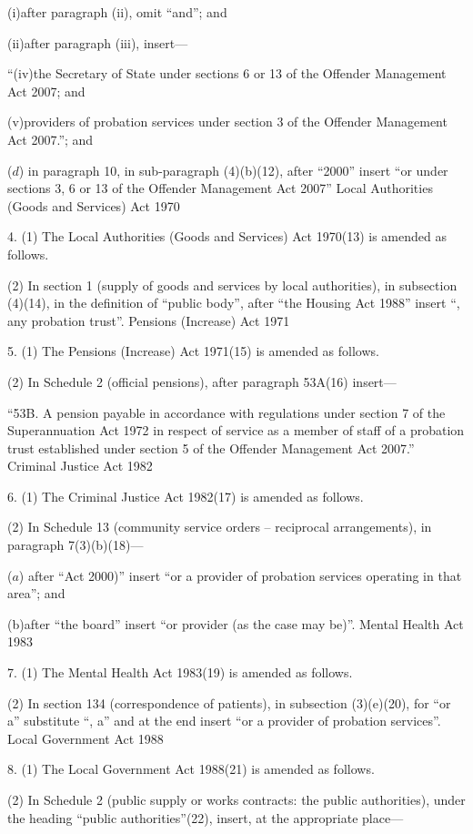 \documentclass[12pt,a4paper]{article}
\begin{document}
(i)after paragraph (ii), omit “and”; and

(ii)after paragraph (iii), insert—

“(iv)the Secretary of State under sections 6 or 13 of the Offender Management Act 2007; and

(v)providers of probation services under section 3 of the Offender Management Act 2007.”; and

($d$) in paragraph 10, in sub-paragraph (4)(b)(12), after “2000” insert “or under sections 3, 6 or 13 of the Offender Management Act 2007”
Local Authorities (Goods and Services) Act 1970

4.  (1)  The Local Authorities (Goods and Services) Act 1970(13) is amended as follows.

(2) In section 1 (supply of goods and services by local authorities), in subsection (4)(14), in the definition of “public body”, after “the Housing Act 1988” insert “, any probation trust”.
Pensions (Increase) Act 1971

5.  (1)  The Pensions (Increase) Act 1971(15) is amended as follows.

(2) In Schedule 2 (official pensions), after paragraph 53A(16) insert—

“53B.  A pension payable in accordance with regulations under section 7 of the Superannuation Act 1972 in respect of service as a member of staff of a probation trust established under section 5 of the Offender Management Act 2007.”
Criminal Justice Act 1982

6.  (1)  The Criminal Justice Act 1982(17) is amended as follows.

(2) In Schedule 13 (community service orders – reciprocal arrangements), in paragraph 7(3)(b)(18)—

($a$) after “Act 2000)” insert “or a provider of probation services operating in that area”; and

(b)after “the board” insert “or provider (as the case may be)”.
Mental Health Act 1983

7.  (1)  The Mental Health Act 1983(19) is amended as follows.

(2) In section 134 (correspondence of patients), in subsection (3)(e)(20), for “or a” substitute “, a” and at the end insert “or a provider of probation services”.
Local Government Act 1988

8.  (1)  The Local Government Act 1988(21) is amended as follows.

(2) In Schedule 2 (public supply or works contracts: the public authorities), under the heading “public authorities”(22), insert, at the appropriate place—
\end{document}

